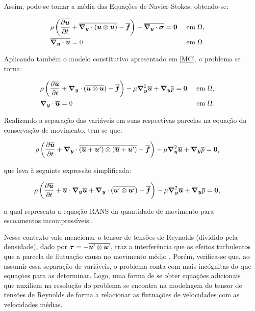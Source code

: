 Assim, pode-se tomar a média das Equações de Navier-Stokes, obtendo-se:

\begin{subequations}
    \begin{align}
         & \rho\left({\overline{\frac{\partial{\boldsymbol{u}}}{\partial t}}+\overline{\boldsymbol{\nabla_y}\cdot(\boldsymbol{u}\otimes\boldsymbol{u})}-\overline{\boldsymbol{f}}}\right)-\overline{\boldsymbol{\nabla_y}\cdot\boldsymbol{\sigma}}=\boldsymbol{0} &  & \text{ em }\Omega\text{,} \\
         & \overline{\boldsymbol{\nabla_y}\cdot\boldsymbol{u}}=0                                                                                 &  & \text{ em }\Omega\text{.}
    \end{align}
\end{subequations}

Aplicando também o modelo constitutivo apresentado em \ref{MC}, o problema se torna:

\begin{subequations}
    \begin{align}
         & \rho\left({\frac{\partial{\overline{\boldsymbol{u}}}}{\partial t}+\boldsymbol{\nabla_y}\cdot(\overline{\boldsymbol{u}\otimes\boldsymbol{u}})-\overline{\boldsymbol{f}}}\right)-\mu\boldsymbol{\nabla}^2_{\boldsymbol{y}}\overline{\boldsymbol{u}}+\boldsymbol{\nabla_y}\overline{p}=\boldsymbol{0} &  & \text{ em }\Omega\text{,} \\
         & \boldsymbol{\nabla_y}\cdot\overline{\boldsymbol{u}}=0                                                                                        &  & \text{ em }\Omega\text{.}
    \end{align}
\end{subequations}

Realizando a separação das variáveis em suas respectivas parcelas na equação da conservação de movimento, tem-se que:

\begin{equation}
    \rho\left({\frac{\partial{\overline{\boldsymbol{u}}}}{\partial t}+\boldsymbol{\nabla_y}\cdot\overline{(\overline{\boldsymbol{u}}+\boldsymbol{u}')\otimes(\overline{\boldsymbol{u}}+\boldsymbol{u}')}-\overline{\boldsymbol{f}}}\right)-\mu\boldsymbol{\nabla}^2_{\boldsymbol{y}}{\overline{\boldsymbol{u}}}+\boldsymbol{\nabla_y}\overline{p}=\boldsymbol{0}\text{,}
\end{equation}

\noindent que leva à seguinte expressão simplificada:

\begin{equation}
    \rho\left({\frac{\partial{\overline{\boldsymbol{u}}}}{\partial t}+\overline{\boldsymbol{u}}\cdot\boldsymbol{\nabla_y}\overline{\boldsymbol{u}}+\boldsymbol{\nabla_y}\cdot(\overline{\boldsymbol{u}'\otimes\boldsymbol{u}'})-\overline{\boldsymbol{f}}}\right)-\mu\boldsymbol{\nabla}^2_{\boldsymbol{y}}\overline{\boldsymbol{u}}+\boldsymbol{\nabla_y}\overline{p}=\boldsymbol{0}\text{,}
    \label{eq:RANS-estac}
\end{equation}

\noindent a qual representa a equação RANS da quantidade de movimento para escoamentos incompressíveis \cite{chou1945velocity,alfonsi2009reynolds}.

Nesse contexto vale mencionar o tensor de tensões de Reynolds (dividido pela densidade), dado por $\boldsymbol{\tau}=-\overline{\boldsymbol{u}'\otimes\boldsymbol{u}'}$, traz a interferência que os efeitos turbulentos que a parcela de flutuação causa no movimento médio \cite{chou1945velocity,alfonsi2009reynolds}. Porém, verifica-se que, ao assumir essa separação de variáveis, o problema conta com mais incógnitas do que equações para as determinar. Logo, uma forma de se obter equações adicionais que auxiliem na resolução do problema se encontra na modelagem do tensor de tensões de Reynolds de forma a relacionar as flutuações de velocidades com as velocidades médias.

